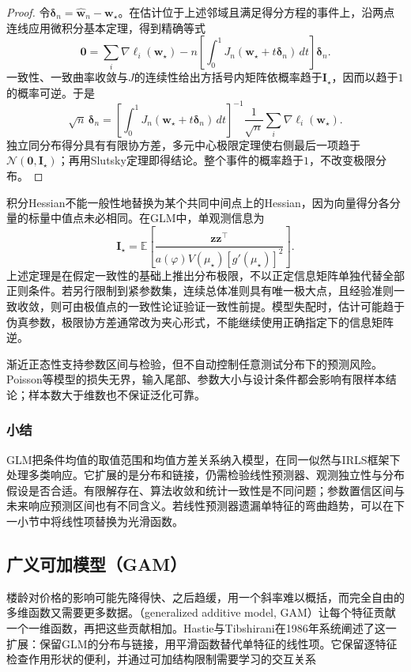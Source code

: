 \begin{proof}
令$\bm{\delta}_n=\widehat{\bm{w}}_n-\bm{w}_{\star}$。在估计位于上述邻域且满足得分方程的事件上，沿两点连线应用微积分基本定理，得到精确等式
\[
  \bm{0}
  =\sum_i\nabla\ell_i(\bm{w}_{\star})
    -n\left[\int_0^1
      J_n(\bm{w}_{\star}+t\bm{\delta}_n)\,dt\right]\bm{\delta}_n.
\]
一致性、一致曲率收敛与$J$的连续性给出方括号内矩阵依概率趋于$\bm{I}_{\star}$，因而以趋于$1$的概率可逆。于是
\[
  \sqrt n\,\bm{\delta}_n
  =\left[\int_0^1J_n(\bm{w}_{\star}+t\bm{\delta}_n)\,dt\right]^{-1}
    \frac{1}{\sqrt n}\sum_i\nabla\ell_i(\bm{w}_{\star}).
\]
独立同分布得分具有有限协方差，多元中心极限定理使右侧最后一项趋于$\mathcal{N}(\bm{0},\bm{I}_{\star})$；再用Slutsky定理即得结论。整个事件的概率趋于$1$，不改变极限分布。
\end{proof}

积分Hessian不能一般性地替换为某个共同中间点上的Hessian，因为向量得分各分量的标量中值点未必相同。在GLM中，单观测信息为
\[
  \bm{I}_{\star}
  =\mathbb{E}\!\left[
    \frac{\bm{z}\bm{z}^{\top}}
      {a(\varphi)V(\mu_{\star})[g'(\mu_{\star})]^2}\right].
\]
上述定理是在假定一致性的基础上推出分布极限，不以正定信息矩阵单独代替全部正则条件。若另行限制到紧参数集，连续总体准则具有唯一极大点，且经验准则一致收敛，则可由极值点的一致性论证验证一致性前提。模型失配时，估计可能趋于伪真参数，极限协方差通常改为夹心形式，不能继续使用正确指定下的信息矩阵逆。

渐近正态性支持参数区间与检验，但不自动控制任意测试分布下的预测风险。Poisson等模型的损失无界，输入尾部、参数大小与设计条件都会影响有限样本结论；样本数大于维数也不保证泛化可靠。

\subsubsection{小结}

GLM把条件均值的取值范围和均值方差关系纳入模型，在同一似然与IRLS框架下处理多类响应。它扩展的是分布和链接，仍需检验线性预测器、观测独立性与分布假设是否合适。有限解存在、算法收敛和统计一致性是不同问题；参数置信区间与未来响应预测区间也有不同含义。若线性预测器遗漏单特征的弯曲趋势，可以在下一小节中将线性项替换为光滑函数。

\subsection{广义可加模型（GAM）}
\label{sec:regression-gam}

楼龄对价格的影响可能先降得快、之后趋缓，用一个斜率难以概括，而完全自由的多维函数又需要更多数据。（generalized additive model, GAM）让每个特征贡献一个一维函数，再把这些贡献相加。Hastie与Tibshirani在1986年系统阐述了这一扩展：保留GLM的分布与链接，用平滑函数替代单特征的线性项。它保留逐特征检查作用形状的便利，并通过可加结构限制需要学习的交互关系

